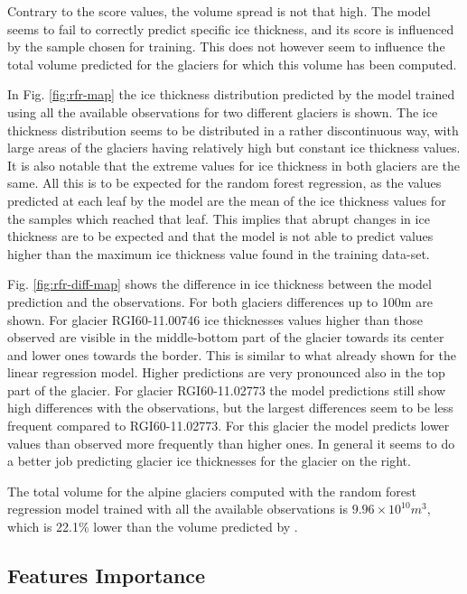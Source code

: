Contrary to the score values, the volume spread is not that high. The model seems to fail to correctly predict specific ice thickness, and its score is influenced by the sample chosen for training. This does not however seem to influence the total volume predicted for the glaciers for which this volume has been computed.

In Fig. \ref{fig:rfr-map} the ice thickness distribution predicted by the model trained using all the available observations for two different glaciers is shown. The ice thickness distribution seems to be distributed in a rather discontinuous way, with large areas of the glaciers having relatively high but constant ice thickness values. It is also notable that the extreme values for ice thickness in both glaciers are the same. All this is to be expected for the random forest regression, as the values predicted at each leaf by the model are the mean of the ice thickness values for the samples which reached that leaf. This implies that abrupt changes in ice thickness are to be expected and that the model is not able to predict values higher than the maximum ice thickness value found in the training data-set.

Fig. \ref{fig:rfr-diff-map} shows the difference in ice thickness between the model prediction and the observations. For both glaciers differences up to 100m are shown. For glacier RGI60-11.00746 ice thicknesses values higher than those observed are visible in the middle-bottom part of the glacier towards its center and lower ones towards the border. This is similar to what already shown for the linear regression model. Higher predictions are very pronounced also in the top part of the glacier. For glacier RGI60-11.02773 the model predictions still show high differences with the observations, but the largest differences  seem to be less frequent compared to RGI60-11.02773. For this glacier the model predicts lower values than observed more frequently than higher ones. In general it seems to do a better job predicting glacier ice thicknesses for the glacier on the right.

The total volume for the alpine glaciers computed with the random forest regression model trained with all the available observations is $9.96 \times 10^{10}m^3$, which is 22.1\% lower than the volume predicted by \citet{Farinotti2019}.

\subsection{Features Importance}\label{rfr-features}

